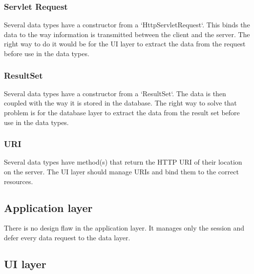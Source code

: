 \subsubsection{Servlet Request}
Several data types have a constructor from a `HttpServletRequest`. This binds the data to the way information is transmitted between the client and the server. The right way to do it would be for the UI layer to extract the data from the request before use in the data types.

\subsubsection{ResultSet}
Several data types have a constructor from a `ResultSet`. The data is then coupled with the way it is stored in the database. The right way to solve that problem is for the database layer to extract the data from the result set before use in the data types.

\subsubsection{URI}
Several data types have method(s) that return the HTTP URI of their location on the server. The UI layer should manage URIs and bind them to the correct resources.





\subsection{Application layer}

There is no design flaw in the application layer. It manages only the session and defer every data request to the data layer.

\subsection{UI layer}

